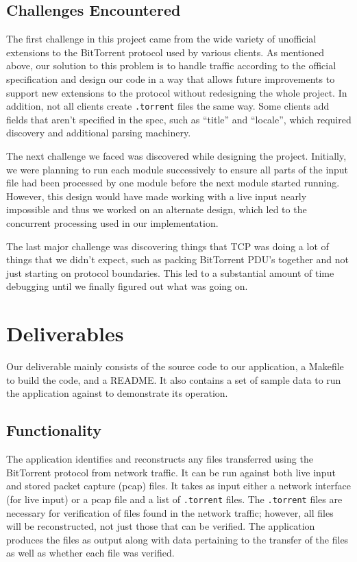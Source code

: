 \documentclass{acm_proc_article-sp}
\begin{document}
\subsection{Challenges Encountered}
The first challenge in this project came from the wide variety of unofficial
extensions to the BitTorrent protocol used by various clients. As mentioned
above, our solution to this problem is to handle traffic according to the
official specification and design our code in a way that allows future
improvements to support new extensions to the protocol without redesigning the
whole project.  In addition, not all clients create \texttt{.torrent} files the
same way.  Some clients add fields that aren't specified in the spec, such as
``title'' and ``locale'', which required discovery and additional parsing
machinery.

The next challenge we faced was discovered while designing the project.
Initially, we were planning to run each module successively to ensure all parts
of the input file had been processed by one module before the next module
started running. However, this design would have made working with a live input
nearly impossible and thus we worked on an alternate design, which led to the
concurrent processing used in our implementation.

The last major challenge was discovering things that TCP was doing a lot of
things that we didn't expect, such as packing BitTorrent PDU's together and not
just starting on protocol boundaries.  This led to a substantial amount of time
debugging until we finally figured out what was going on.

\section{Deliverables}
Our deliverable mainly consists of the source code to our application, a
Makefile to build the code, and a README. It also contains a set of sample data
to run the application against to demonstrate its operation.

\subsection{Functionality}
The application identifies and reconstructs any files transferred using the
BitTorrent protocol from network traffic. It can be run against both live input
and stored packet capture (pcap) files. It takes as input either a network
interface (for live input) or a pcap file and a list of \texttt{.torrent}
files. The \texttt{.torrent} files are necessary for verification of files found
in the network traffic; however, all files will be reconstructed, not just those
that can be verified. The application produces the files as output along with
data pertaining to the transfer of the files as well as whether each file was
verified.
\end{document}
